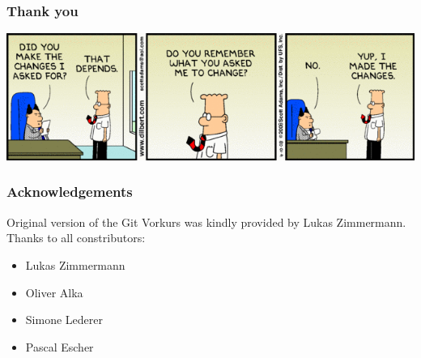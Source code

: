 \documentclass{beamer} %
\begin{document}
\begin{frame}
\frametitle{Thank you}

\begin{center}
	\includegraphics[scale=0.45]{assets/Change-management-humor.png}
\end{center}

\end{frame}

\begin{frame}
\frametitle{Acknowledgements}

Original version of the Git Vorkurs was kindly provided by 
Lukas Zimmermann. \\

Thanks to all constributors:
\begin{itemize}
\item Lukas Zimmermann
\item Oliver Alka 
\item Simone Lederer
\item Pascal Escher
\end{itemize}


\end{frame}
\end{document}
